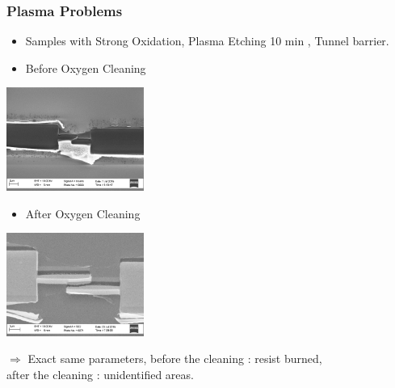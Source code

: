 \documentclass[handout]{beamer}
\begin{document}
        \begin{frame}
            \frametitle{Plasma Problems}          
        \begin{itemize}
            \item Samples with Strong Oxidation, Plasma Etching 10 min , Tunnel barrier.
        \end{itemize}

        \begin{multicols}{2}
            \begin{itemize}
                \item Before Oxygen Cleaning
            \end{itemize}
            \centering\includegraphics[width=45mm]{Burned2.png}
            
            \begin{itemize}
                \item After Oxygen Cleaning
            \end{itemize}
            \centering\includegraphics[width=45mm]{Burned1.png}
        \end{multicols}        
        
        $\Longrightarrow$ Exact same parameters, before the cleaning : resist burned,\\after the cleaning : unidentified areas.
    \end{frame}
    
\end{document}
